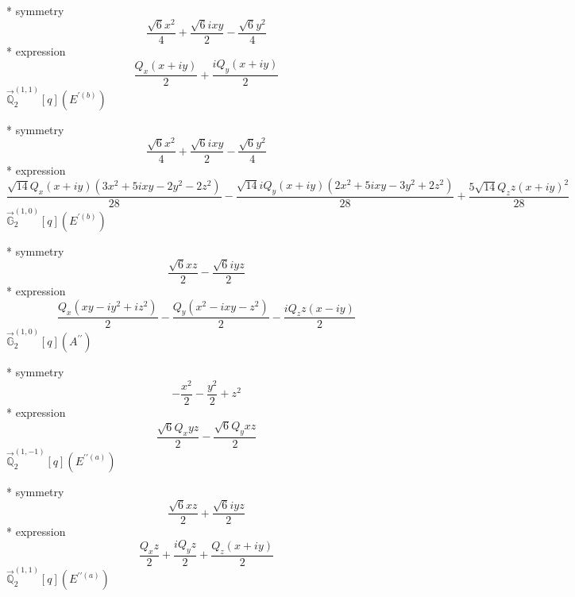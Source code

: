 \documentclass[fleqn,8pt]{jsarticle}
\begin{document}
\noindent\quad ** symmetry
\begin{dmath*}
\frac{\sqrt{6} x^{2}}{4} + \frac{\sqrt{6} i x y}{2} - \frac{\sqrt{6} y^{2}}{4}
\end{dmath*}
\noindent\quad ** expression
\begin{dmath*}
\frac{Q_{x} \left(x + i y\right)}{2} + \frac{i Q_{y} \left(x + i y\right)}{2}
\end{dmath*}
\noindent\quad $\vec{\mathbb{Q}}_{2}^{(1,1)}[q](E^{\prime(b)})$

\noindent\quad ** symmetry
\begin{dmath*}
\frac{\sqrt{6} x^{2}}{4} + \frac{\sqrt{6} i x y}{2} - \frac{\sqrt{6} y^{2}}{4}
\end{dmath*}
\noindent\quad ** expression
\begin{dmath*}
\frac{\sqrt{14} Q_{x} \left(x + i y\right) \left(3 x^{2} + 5 i x y - 2 y^{2} - 2 z^{2}\right)}{28} - \frac{\sqrt{14} i Q_{y} \left(x + i y\right) \left(2 x^{2} + 5 i x y - 3 y^{2} + 2 z^{2}\right)}{28} + \frac{5 \sqrt{14} Q_{z} z \left(x + i y\right)^{2}}{28}
\end{dmath*}
\noindent\quad $\vec{\mathbb{G}}_{2}^{(1,0)}[q](E^{\prime(b)})$

\noindent\quad ** symmetry
\begin{dmath*}
\frac{\sqrt{6} x z}{2} - \frac{\sqrt{6} i y z}{2}
\end{dmath*}
\noindent\quad ** expression
\begin{dmath*}
\frac{Q_{x} \left(x y - i y^{2} + i z^{2}\right)}{2} - \frac{Q_{y} \left(x^{2} - i x y - z^{2}\right)}{2} - \frac{i Q_{z} z \left(x - i y\right)}{2}
\end{dmath*}
\noindent\quad $\vec{\mathbb{G}}_{2}^{(1,0)}[q](A^{\prime\prime})$

\noindent\quad ** symmetry
\begin{dmath*}
- \frac{x^{2}}{2} - \frac{y^{2}}{2} + z^{2}
\end{dmath*}
\noindent\quad ** expression
\begin{dmath*}
\frac{\sqrt{6} Q_{x} y z}{2} - \frac{\sqrt{6} Q_{y} x z}{2}
\end{dmath*}
\noindent\quad $\vec{\mathbb{Q}}_{2}^{(1,-1)}[q](E^{\prime\prime(a)})$

\noindent\quad ** symmetry
\begin{dmath*}
\frac{\sqrt{6} x z}{2} + \frac{\sqrt{6} i y z}{2}
\end{dmath*}
\noindent\quad ** expression
\begin{dmath*}
\frac{Q_{x} z}{2} + \frac{i Q_{y} z}{2} + \frac{Q_{z} \left(x + i y\right)}{2}
\end{dmath*}
\noindent\quad $\vec{\mathbb{Q}}_{2}^{(1,1)}[q](E^{\prime\prime(a)})$
\end{document}
